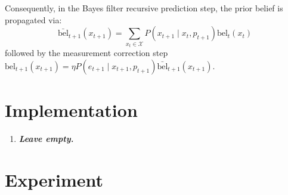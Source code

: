 \documentclass{article}
\begin{document}
\begin{enumerate}[label=\alph*.,leftmargin=*]
    Consequently, in the Bayes filter recursive prediction step, the prior belief is propagated via:
    \begin{equation}
        \bar{\text{bel}}_{t+1}(x_{t+1}) = \sum_{x_t \in \mathcal{X}} P(x_{t+1} \mid x_t, p_{t+1}) \text{bel}_t(x_t)
    \end{equation}
    followed by the measurement correction step $\text{bel}_{t+1}(x_{t+1}) = \eta P(e_{t+1} \mid x_{t+1}, p_{t+1}) \bar{\text{bel}}_{t+1}(x_{t+1})$.
\end{enumerate}

\section{Implementation}

\begin{enumerate}[label=\alph*.,leftmargin=*]
    \item \textbf{\textit{Leave empty.}}
\end{enumerate}

\section{Experiment}
\end{document}
